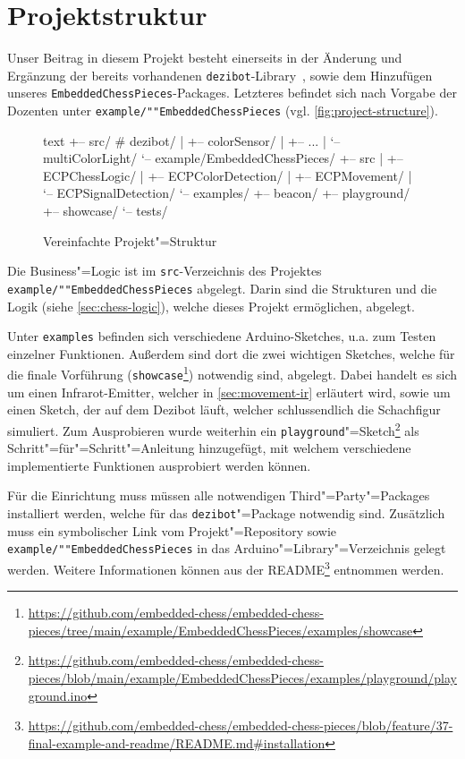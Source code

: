 
\section{Projektstruktur}
\label{sec:final-project-structure}

Unser Beitrag in diesem Projekt besteht einerseits in der Änderung und Ergänzung der bereits vorhandenen \texttt{dezibot}-Library~\cite{dezibotteamDezibotDezibot2025}, sowie dem Hinzufügen unseres \texttt{Embedded\-Chess\-Pieces}-Packages. Letzteres befindet sich nach Vorgabe der Dozenten unter \texttt{example/""Embedded\-Chess\-Pieces} (vgl. \autoref{fig:project-structure}).

\begin{figure}[h]
\centering
\begin{cminted}{text}
+-- src/              # dezibot/
|   +-- colorSensor/
|   +-- ...
|   `-- multiColorLight/
`-- example/EmbeddedChessPieces/
    +-- src
    |   +-- ECPChessLogic/
    |   +-- ECPColorDetection/
    |   +-- ECPMovement/
    |   `-- ECPSignalDetection/
    `-- examples/
        +-- beacon/
        +-- playground/
        +-- showcase/
        `-- tests/
\end{cminted}
\caption{Vereinfachte Projekt"=Struktur}
\label{fig:project-structure}
\end{figure}

Die Business"=Logic ist im \texttt{src}-Verzeichnis des Projektes \texttt{example/""Embedded\-Chess\-Pieces} abgelegt. Darin sind die Strukturen und die Logik (siehe \autoref{sec:chess-logic}), welche dieses Projekt ermöglichen, abgelegt.

Unter \texttt{examples} befinden sich verschiedene Arduino-Sketches, u.a. zum Testen einzelner Funktionen. Außerdem sind dort die zwei wichtigen Sketches, welche für die finale Vorführung (\texttt{showcase}\footnote{\url{https://github.com/embedded-chess/embedded-chess-pieces/tree/main/example/EmbeddedChessPieces/examples/showcase}}) notwendig sind, abgelegt. Dabei handelt es sich um einen Infrarot-Emitter, welcher in \autoref{sec:movement-ir} erläutert wird, sowie um einen Sketch, der auf dem Dezibot läuft, welcher schlussendlich die Schachfigur simuliert. Zum Ausprobieren wurde weiterhin ein \texttt{playground}"=Sketch\footnote{\url{https://github.com/embedded-chess/embedded-chess-pieces/blob/main/example/EmbeddedChessPieces/examples/playground/playground.ino}} als Schritt"=für"=Schritt"=Anleitung hinzugefügt, mit welchem verschiedene implementierte Funktionen ausprobiert werden können.

Für die Einrichtung muss müssen alle notwendigen Third"=Party"=Packages installiert werden, welche für das \texttt{dezibot}"=Package notwendig sind. Zusätzlich muss ein symbolischer Link vom Projekt"=Repository sowie \texttt{example/""Embedded\-Chess\-Pieces} in das Arduino"=Library"=Verzeichnis gelegt werden. Weitere Informationen können aus der README\footnote{\url{https://github.com/embedded-chess/embedded-chess-pieces/blob/feature/37-final-example-and-readme/README.md\#installation}} entnommen werden.

